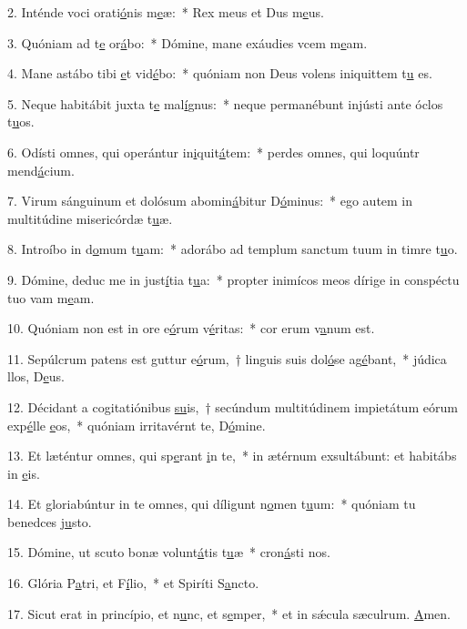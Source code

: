 2. Inténde voci orati\uline{ó}nis m\uline{e}æ:~* Rex meus et Dus m\uline{e}us.\par 
3. Quóniam ad t\uline{e} or\uline{á}bo:~* Dómine, mane exáudies vcem m\uline{e}am.\par 
4. Mane astábo tibi \uline{e}t vid\uline{é}bo:~* quóniam non Deus volens iniquittem t\uline{u} es.\par 
5. Neque habitábit juxta t\uline{e} mal\uline{í}gnus:~* neque permanébunt injústi ante óclos t\uline{u}os.\par 
6. Odísti omnes, qui operántur in\uline{i}quit\uline{á}tem:~* perdes omnes, qui loquúntr mend\uline{á}cium.\par 
7. Virum sánguinum et dolósum abomin\uline{á}bitur D\uline{ó}minus:~* ego autem in multitúdine misericórdæ t\uline{u}æ.\par 
8. Introíbo in d\uline{o}mum t\uline{u}am:~* adorábo ad templum sanctum tuum in timre t\uline{u}o.\par 
9. Dómine, deduc me in just\uline{í}tia t\uline{u}a:~* propter inimícos meos dírige in conspéctu tuo vam m\uline{e}am.\par 
10. Quóniam non est in ore e\uline{ó}rum v\uline{é}ritas:~* cor erum v\uline{a}num est.\par 
11. Sepúlcrum patens est guttur e\uline{ó}rum,~† linguis suis dol\uline{ó}se ag\uline{é}bant,~* júdica llos, D\uline{e}us.\par 
12. Décidant a cogitatiónibus \uline{su}is,~† secúndum multitúdinem impietátum eórum exp\uline{é}lle \uline{e}os,~* quóniam irritavérnt te, D\uline{ó}mine.\par 
13. Et læténtur omnes, qui sp\uline{e}rant \uline{i}n te,~* in ætérnum exsultábunt: et habitábs in \uline{e}is.\par 
14. Et gloriabúntur in te omnes, qui díligunt n\uline{o}men t\uline{u}um:~* quóniam tu benedces j\uline{u}sto.\par 
15. Dómine, ut scuto bonæ volunt\uline{á}tis t\uline{u}æ~* cron\uline{á}sti nos.\par 
16. Glória P\uline{a}tri, et F\uline{í}lio,~* et Spiríti S\uline{a}ncto.\par 
17. Sicut erat in princípio, et n\uline{u}nc, et s\uline{e}mper,~* et in sǽcula sæculrum. \uline{A}men.\par 
